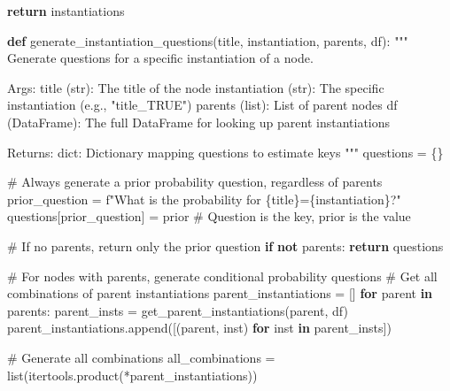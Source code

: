 \documentclass[
  11pt,
  letterpaper,
]{book}
\newenvironment{Shaded}{\begin{snugshade}}{\end{snugshade}}
\newcommand{\BuiltInTok}[1]{\textcolor[rgb]{0.00,0.23,0.31}{#1}}
\newcommand{\CommentTok}[1]{\textcolor[rgb]{0.37,0.37,0.37}{#1}}
\newcommand{\ControlFlowTok}[1]{\textcolor[rgb]{0.00,0.23,0.31}{\textbf{#1}}}
\newcommand{\KeywordTok}[1]{\textcolor[rgb]{0.00,0.23,0.31}{\textbf{#1}}}
\newcommand{\NormalTok}[1]{\textcolor[rgb]{0.00,0.23,0.31}{#1}}
\newcommand{\OperatorTok}[1]{\textcolor[rgb]{0.37,0.37,0.37}{#1}}
\newcommand{\SpecialCharTok}[1]{\textcolor[rgb]{0.37,0.37,0.37}{#1}}
\newcommand{\SpecialStringTok}[1]{\textcolor[rgb]{0.13,0.47,0.30}{#1}}
\newcommand{\StringTok}[1]{\textcolor[rgb]{0.13,0.47,0.30}{#1}}
\begin{document}
\begin{Shaded}
\begin{Highlighting}[]
    \ControlFlowTok{return}\NormalTok{ instantiations}

\KeywordTok{def}\NormalTok{ generate\_instantiation\_questions(title, instantiation, parents, df):}
    \CommentTok{"""}
\CommentTok{    Generate questions for a specific instantiation of a node.}

\CommentTok{    Args:}
\CommentTok{        title (str): The title of the node}
\CommentTok{        instantiation (str): The specific instantiation (e.g., "title\_TRUE")}
\CommentTok{        parents (list): List of parent nodes}
\CommentTok{        df (DataFrame): The full DataFrame for looking up parent instantiations}

\CommentTok{    Returns:}
\CommentTok{        dict: Dictionary mapping questions to estimate keys}
\CommentTok{    """}
\NormalTok{    questions }\OperatorTok{=}\NormalTok{ \{\}}

    \CommentTok{\# Always generate a prior probability question, regardless of parents}
\NormalTok{    prior\_question }\OperatorTok{=} \SpecialStringTok{f"What is the probability for }\SpecialCharTok{\{}\NormalTok{title}\SpecialCharTok{\}}\SpecialStringTok{=}\SpecialCharTok{\{}\NormalTok{instantiation}\SpecialCharTok{\}}\SpecialStringTok{?"}
\NormalTok{    questions[prior\_question] }\OperatorTok{=} \StringTok{\textquotesingle{}prior\textquotesingle{}}  \CommentTok{\# Question is the key, \textquotesingle{}prior\textquotesingle{} is the value}

    \CommentTok{\# If no parents, return only the prior question}
    \ControlFlowTok{if} \KeywordTok{not}\NormalTok{ parents:}
        \ControlFlowTok{return}\NormalTok{ questions}

    \CommentTok{\# For nodes with parents, generate conditional probability questions}
    \CommentTok{\# Get all combinations of parent instantiations}
\NormalTok{    parent\_instantiations }\OperatorTok{=}\NormalTok{ []}
    \ControlFlowTok{for}\NormalTok{ parent }\KeywordTok{in}\NormalTok{ parents:}
\NormalTok{        parent\_insts }\OperatorTok{=}\NormalTok{ get\_parent\_instantiations(parent, df)}
\NormalTok{        parent\_instantiations.append([(parent, inst) }\ControlFlowTok{for}\NormalTok{ inst }\KeywordTok{in}\NormalTok{ parent\_insts])}

    \CommentTok{\# Generate all combinations}
\NormalTok{    all\_combinations }\OperatorTok{=} \BuiltInTok{list}\NormalTok{(itertools.product(}\OperatorTok{*}\NormalTok{parent\_instantiations))}


\end{Highlighting}
\end{Shaded}
\end{document}
